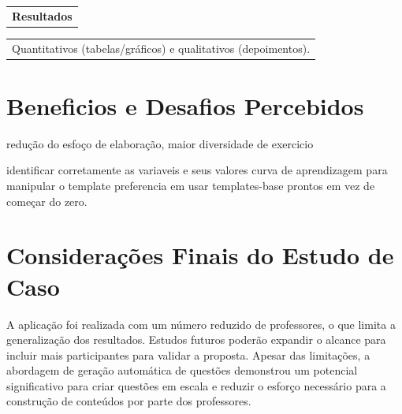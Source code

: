 \begin{table}
\centering

\begin{tabular}{l}
 \\

\end{tabular}

\end{table}

\begin{table}
\centering

\begin{tabular}{l}
\textbf{Resultados} \\

\end{tabular}

\end{table}

\begin{table}
\centering

\begin{tabular}{l}
Quantitativos (tabelas/gráficos) e qualitativos (depoimentos). \\

\end{tabular}

\end{table}

 
\section{Beneficios e Desafios Percebidos} 

redução do esfoço de elaboração, maior diversidade de exercicio

identificar corretamente as variaveis e seus valores
curva de aprendizagem para manipular o template
preferencia em usar templates-base prontos em vez de começar do zero.

\section{Considerações Finais do Estudo de Caso}
A aplicação foi realizada com um número reduzido de professores, o que limita a generalização dos resultados. Estudos futuros poderão expandir o alcance para incluir mais participantes para validar a proposta. Apesar das limitações, a abordagem de geração automática de questões demonstrou um potencial significativo para criar questões em escala e reduzir o esforço necessário para a construção de conteúdos por parte dos professores.


